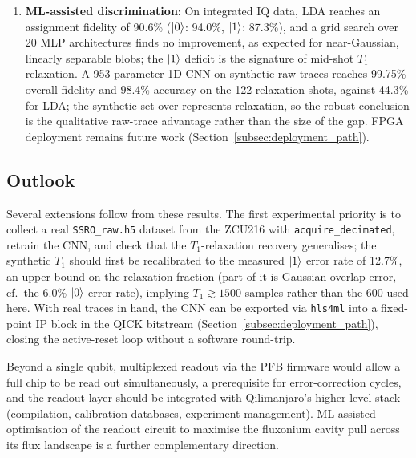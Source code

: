 \begin{enumerate}
  \item \textbf{ML-assisted discrimination}: On integrated IQ data, LDA reaches an
        assignment fidelity of 90.6\% ($\ket{0}$: 94.0\%, $\ket{1}$: 87.3\%), and a
        grid search over 20 MLP architectures finds no improvement, as expected for
        near-Gaussian, linearly separable blobs; the $\ket{1}$ deficit is the
        signature of mid-shot $T_1$ relaxation.  A
        953-parameter 1D CNN on synthetic raw traces reaches 99.75\% overall
        fidelity and 98.4\% accuracy on the 122 relaxation shots, against 44.3\%
        for LDA; the synthetic set over-represents relaxation, so the robust
        conclusion is the qualitative raw-trace advantage rather than the size of
        the gap.  FPGA deployment remains future work
        (Section~\ref{subsec:deployment_path}).
\end{enumerate}

\subsection{Outlook}

Several extensions follow from these results.  The first experimental
priority is to collect a real \texttt{SSRO\_raw.h5} dataset from the ZCU216 with
\texttt{acquire\_decimated}, retrain the CNN, and check that the $T_1$-relaxation
recovery generalises; the synthetic $T_1$ should first be recalibrated
to the measured $\ket{1}$ error rate of 12.7\%, an upper bound on the relaxation
fraction (part of it is Gaussian-overlap error, cf.\ the 6.0\% $\ket{0}$ error
rate), implying $T_1 \gtrsim 1500$ samples rather than the 600 used
here.  With real traces in hand, the
CNN can be exported via \texttt{hls4ml} into a fixed-point IP block in
the QICK bitstream (Section~\ref{subsec:deployment_path}), closing the active-reset
loop without a software round-trip.

Beyond a single qubit, multiplexed readout via the \QICK{} PFB firmware
would allow a full chip to be read out simultaneously, a
prerequisite for error-correction cycles, and the readout layer
should be integrated with Qilimanjaro's higher-level stack
(compilation, calibration databases, experiment
management).  ML-assisted optimisation of the readout circuit to
maximise the fluxonium cavity pull across its flux landscape is a further
complementary direction.
